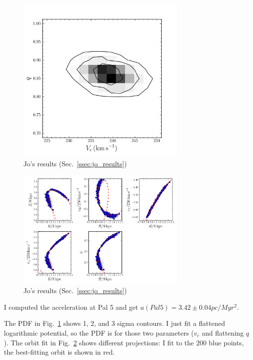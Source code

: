 \begin{figure}
\includegraphics[width=83mm]{./figures/jo_results.png}
  \caption{Jo's results (Sec.~\ref{ssec:jo_results})}
  \label{plot_jo_results}
\end{figure}

\begin{figure}
\includegraphics[width=83mm]{./figures/jo_orbitfit.png}
  \caption{Jo's results (Sec.~\ref{ssec:jo_results})}
  \label{plot_jo_orbitfit}
\end{figure}

I computed the acceleration at Pal 5 and get
$a(Pal5) = 3.42 \pm 0.04 pc/Myr^2$.

The PDF in Fig.~\ref{plot_jo_results} shows 1, 2, and 3 sigma contours. 
I just fit a flattened logarithmic potential, so the PDF is for those two parameters ($v_c$ and flattening $q$). 
The orbit fit in Fig.~\ref{plot_jo_orbitfit} shows different projections: I fit to the 200 blue points, the best-fitting orbit is shown in red.
